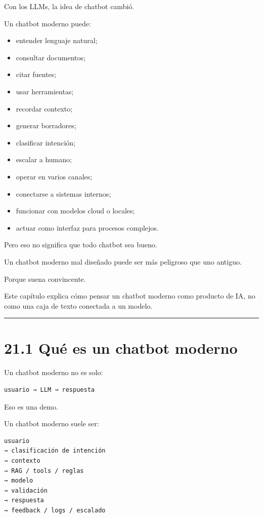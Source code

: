 Con los LLMs, la idea de chatbot cambió.

Un chatbot moderno puede:

\begin{itemize}
\tightlist
\item
  entender lenguaje natural;
\item
  consultar documentos;
\item
  citar fuentes;
\item
  usar herramientas;
\item
  recordar contexto;
\item
  generar borradores;
\item
  clasificar intención;
\item
  escalar a humano;
\item
  operar en varios canales;
\item
  conectarse a sistemas internos;
\item
  funcionar con modelos cloud o locales;
\item
  actuar como interfaz para procesos complejos.
\end{itemize}

Pero eso no significa que todo chatbot sea bueno.

Un chatbot moderno mal diseñado puede ser más peligroso que uno antiguo.

Porque suena convincente.

Este capítulo explica cómo pensar un chatbot moderno como producto de
IA, no como una caja de texto conectada a un modelo.

\begin{center}\rule{0.5\linewidth}{0.5pt}\end{center}

\section{21.1 Qué es un chatbot
moderno}\label{quuxe9-es-un-chatbot-moderno}

Un chatbot moderno no es solo:

\begin{lstlisting}
usuario → LLM → respuesta
\end{lstlisting}

Eso es una demo.

Un chatbot moderno suele ser:

\begin{lstlisting}
usuario
→ clasificación de intención
→ contexto
→ RAG / tools / reglas
→ modelo
→ validación
→ respuesta
→ feedback / logs / escalado
\end{lstlisting}

